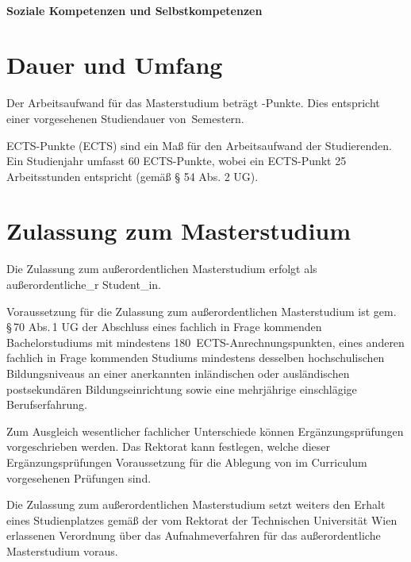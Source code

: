 \paragraph{Soziale Kompetenzen und Selbstkompetenzen}

\section{Dauer und Umfang}\label{sec:DU}

Der Arbeitsaufwand für das Masterstudium \emph{}
beträgt -Punkte. Dies entspricht einer vorgesehenen
Studiendauer von \,Semestern.

ECTS-Punkte (ECTS) sind ein Maß für den Arbeitsaufwand der Studierenden. 
Ein Studienjahr umfasst 60 ECTS­-Punkte, wobei ein ECTS-Punkt 25 
Arbeitsstunden entspricht (gemäß § 54 Abs. 2 UG).

\section{Zulassung zum Masterstudium}\label{sec:ZM}

\newcommand*\AuflagenZurHerstellungDerGleichwertigkeit{%
  \ifDEF{VerwendungAuflagen}{%
    \VAR{VerwendungAuflagen}%
  }{}%
}

Die Zulassung zum außerordentlichen Masterstudium \emph{} 
erfolgt als außerordentliche\_r Student\_in.

Voraussetzung für die Zulassung zum außerordentlichen Masterstudium 
\emph{} ist gem. \S\,70 Abs.\,1 UG der Abschluss eines fachlich 
in Frage kommenden Bachelorstudiums mit mindestens 
180~ECTS-Anrechnungspunkten, eines anderen fachlich in Frage 
kommenden Studiums mindestens desselben hochschulischen 
Bildungsniveaus an einer anerkannten inländischen oder 
ausländischen postsekundären Bildungseinrichtung sowie  eine 
mehrjährige einschlägige Berufserfahrung. 

Zum Ausgleich wesentlicher fachlicher Unterschiede können 
Ergänzungsprüfungen vorgeschrieben werden. Das Rektorat kann 
festlegen, welche dieser Ergänzungsprüfungen Voraussetzung für die 
Ablegung von im Curriculum vorgesehenen Prüfungen sind. 

Die Zulassung zum außerordentlichen Masterstudium \emph{} 
setzt weiters den Erhalt eines Studienplatzes gemäß der vom Rektorat der 
Technischen Universität Wien erlassenen Verordnung über das 
Aufnahmeverfahren für das außerordentliche Masterstudium 
\emph{} voraus.

